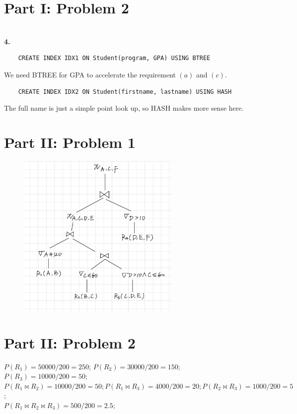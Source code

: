 \documentclass[letterpaper,11pt]{article}
\newcommand{\Paragraph}[1]{~\vspace*{-0.7\baselineskip}\\{\bf #1}}
\begin{document}
\newpage
\section*{Part I: Problem 2}
\Paragraph{4.}
\begin{verbatim}
	CREATE INDEX IDX1 ON Student(program, GPA) USING BTREE
\end{verbatim}
We need BTREE for GPA to accelerate the requirement \((a)\) and \((c)\). \\
\begin{verbatim}
	CREATE INDEX IDX2 ON Student(firstname, lastname) USING HASH
\end{verbatim}
The full name is just a simple point look up, so HASH makes more sense here. 


\section*{Part II: Problem 1}
\begin{figure}[h]
    \centering
    \includegraphics[width=0.7\textwidth]{p2-1.jpg}
\end{figure}

\newpage
\section*{Part II: Problem 2}
\(P(R_1) = 50000/200 = 250\); \(P(R_2) = 30000/200 = 150\); \(P(R_3) = 10000/200 = 50\);\\
\(P(R_1 \Join R_2) = 10000/200 = 50; P(R_1 \Join R_3) = 4000/200 = 20; P(R_2 \Join R_3) = 1000/200 = 5\);\\
\(P(R_1 \Join R_2 \Join R_3) = 500/200 = 2.5\); 
\end{document}
